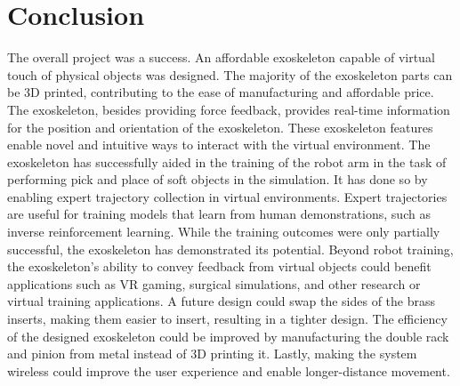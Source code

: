 \chapter{Conclusion}
\label{chap:conclusion}
The overall project was a success. An affordable exoskeleton capable of virtual touch of physical objects was designed. The majority of the exoskeleton parts can be 3D printed, contributing to the ease of manufacturing and affordable price. The exoskeleton, besides providing force feedback, provides real-time information for the position and orientation of the exoskeleton. These exoskeleton features enable novel and intuitive ways to interact with the virtual environment. The exoskeleton has successfully aided in the training of the robot arm in the task of performing pick and place of soft objects in the simulation. It has done so by enabling expert trajectory collection in virtual environments. Expert trajectories are useful for training models that learn from human demonstrations, such as inverse reinforcement learning. While the training outcomes were only partially successful, the exoskeleton has demonstrated its potential. Beyond robot training, the exoskeleton's ability to convey feedback from virtual objects could benefit applications such as VR gaming, surgical simulations, and other research or virtual training applications. A future design could swap the sides of the brass inserts, making them easier to insert, resulting in a tighter design. The efficiency of the designed exoskeleton could be improved by manufacturing the double rack and pinion from metal instead of 3D printing it. Lastly, making the system wireless could improve the user experience and enable longer-distance movement.